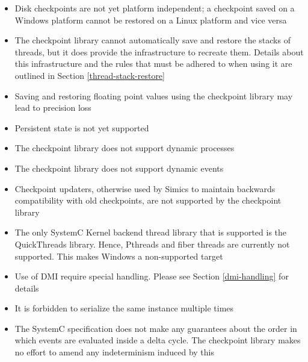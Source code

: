 \documentclass[oneside]{memoir}
\begin{document}
\begin{itemize}

\item Disk checkpoints are not yet platform independent; a checkpoint saved on a Windows platform cannot be restored on a Linux platform and vice versa

\item The checkpoint library cannot automatically save and restore the stacks of threads, but it does provide the infrastructure to recreate them.
  Details about this infrastructure and the rules that must be adhered to when using it are outlined in Section \ref{thread-stack-restore}

\item Saving and restoring floating point values using the checkpoint library may lead to precision loss

\item Persistent state is not yet supported

\item The checkpoint library does not support dynamic processes

\item The checkpoint library does not support dynamic events

\item Checkpoint updaters, otherwise used by Simics to maintain backwards compatibility with old checkpoints, are not supported by the checkpoint library

\item The only SystemC Kernel backend thread library that is supported is the QuickThreads library.
  Hence, Pthreads and fiber threads are currently not supported.
  This makes Windows a non-supported target

\item Use of DMI require special handling.
  Please see Section \ref{dmi-handling} for details

\item It is forbidden to serialize the same instance multiple times

\item The SystemC specification does not make any guarantees about the order in which events are evaluated inside a delta cycle.
  The checkpoint library makes no effort to amend any indeterminism induced by this

\end{itemize}
\end{document}
